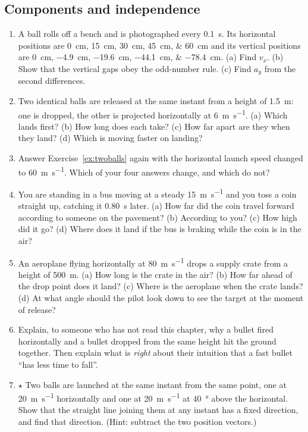 \documentclass[11pt,twoside,openany]{book}
\begin{document}
\subsection*{Components and independence}
\begin{enumerate}[label=\textbf{\thechapter.\arabic*},resume=exercises,leftmargin=*]
  \item A ball rolls off a bench and is photographed every \SI{0.1}{\second}. Its horizontal positions are \SIlist{0;15;30;45;60}{\centi\metre} and its vertical positions are \SIlist{0;-4.9;-19.6;-44.1;-78.4}{\centi\metre}. (a) Find $v_x$. (b) Show that the vertical gaps obey the odd-number rule. (c) Find $a_y$ from the second differences.
  \item Two identical balls are released at the same instant from a height of \SI{1.5}{\metre}\label{ex:twoballs}: one is dropped, the other is projected horizontally at \SI{6}{\metre\per\second}. (a) Which lands first? (b) How long does each take? (c) How far apart are they when they land? (d) Which is moving faster on landing?
  \item Answer Exercise~\ref{ex:twoballs} again with the horizontal launch speed changed to \SI{60}{\metre\per\second}. Which of your four answers change, and which do not?
  \item You are standing in a bus moving at a steady \SI{15}{\metre\per\second} and you toss a coin straight up, catching it \SI{0.80}{\second} later. (a) How far did the coin travel forward according to someone on the pavement? (b) According to you? (c) How high did it go? (d) Where does it land if the bus is braking while the coin is in the air?\label{ex:acceltrain}
  \item An aeroplane flying horizontally at \SI{80}{\metre\per\second} drops a supply crate from a height of \SI{500}{\metre}. (a) How long is the crate in the air? (b) How far ahead of the drop point does it land? (c) Where is the aeroplane when the crate lands? (d) At what angle should the pilot look down to see the target at the moment of release?
  \item Explain, to someone who has not read this chapter, why a bullet fired horizontally and a bullet dropped from the same height hit the ground together. Then explain what is \emph{right} about their intuition that a fast bullet ``has less time to fall''.
  \item $\star$ Two balls are launched at the same instant from the same point, one at \SI{20}{\metre\per\second} horizontally and one at \SI{20}{\metre\per\second} at \SI{40}{\degree} above the horizontal. Show that the straight line joining them at any instant has a fixed direction, and find that direction. (Hint: subtract the two position vectors.)
\end{enumerate}
\end{document}
